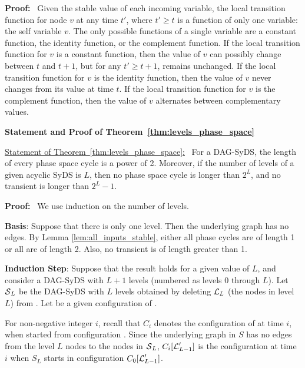 \medskip

\noindent
\textbf{Proof:}~
Given the stable value of each incoming variable, the local transition
function for node $v$ at any time $t'$, where $t' \geq t$ is a
function of only one variable: the self variable $v$.  The only
possible functions of a single variable are a constant function,
the identity function, or the complement function.  If the local
transition function for $v$ is a constant function, then the value
of $v$ can possibly change between $t$ and $t+1$, but for any $t'
\geq t+1$, remains unchanged.  If the local transition function for
$v$ is the identity function, then the value of $v$ never changes
from its value at time $t$.  If the local transition function for
$v$ is the complement function, then the value of $v$ alternates
between complementary values.  \QED

\medskip

\noindent
\textbf{Statement and Proof of Theorem~\ref{thm:levels_phase_space}}

\medskip

\noindent
\underline{Statement of Theorem~\ref{thm:levels_phase_space}:}~
For a DAG-SyDS,
the length of every phase space cycle is a power of 2.
Moreover, if the number of levels of a given acyclic SyDS is $L$,
then no phase space cycle is longer than $2^L$,
and no transient is longer than $2^L-1$.

\medskip

\noindent
\textbf{Proof:}~ We use induction on the number of levels.

\smallskip

\noindent
{\bf Basis}: Suppose that there is only one level.
Then the underlying  graph has no edges.
By Lemma \ref{lem:all_inputs_stable},
either all phase cycles are of length 1 or all are of length 2. 
Also, no transient is of length greater than 1.

\smallskip

\noindent
{\bf Induction Step}: Suppose that the result holds for a given value of $L$,
and consider a DAG-SyDS \cals{} with $L+1$ levels (numbered as levels 0 through $L$).
Let $\mbox{$\mathcal{S}$}_L$ be the DAG-SyDS with $L$ levels obtained 
by deleting $\mbox{$\mathcal{L}$}_L$ (the nodes in level $L$) from \cals{}.
Let \calc{} be a given configuration of \cals{}.

\smallskip

For non-negative integer $i$, 
recall that $C_i$ denotes the configuration of \cals{} at time $i$, 
when started from configuration \calc{}.
Since the underlying graph in $S$ has 
no edges from the level $L$ nodes to the nodes in $\mbox{$\mathcal{S}$}_L$,
$C_i[\mbox{$\mathcal{L}$}_{L-1}']$ is the configuration at time $i$ 
when $S_L$ starts in configuration $C_0[\mbox{$\mathcal{L}$}_{L-1}']$.

